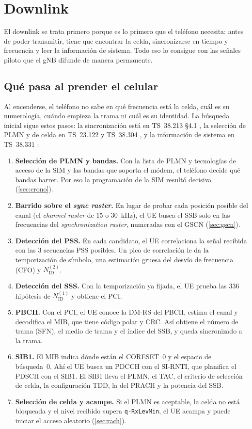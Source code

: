 \section{Downlink}\label{sec:dl}

El downlink se trata primero porque es lo primero que el teléfono necesita: antes de poder transmitir, tiene que encontrar la celda, sincronizarse en tiempo y frecuencia y leer la información de sistema. Todo eso lo consigue con las señales piloto que el gNB difunde de manera permanente.

\subsection{Qué pasa al prender el celular}\label{sec:encendido}
Al encenderse, el teléfono no sabe en qué frecuencia está la celda, cuál es su numerología, cuándo empieza la trama ni cuál es su identidad. La búsqueda inicial sigue estos pasos: la sincronización está en TS~38.213 §4.1 \cite{ts38213}, la selección de PLMN y de celda en TS~23.122 y TS~38.304 \cite{ts23122,ts38304}, y la información de sistema en TS~38.331 \cite{ts38331}:
\begin{enumerate}
  \item \textbf{Selección de PLMN y bandas.} Con la lista de PLMN y tecnologías de acceso de la SIM y las bandas que soporta el módem, el teléfono decide qué bandas barrer. Por eso la programación de la SIM resultó decisiva (\cref{sec:crono}).
  \item \textbf{Barrido sobre el \emph{sync raster}.} En lugar de probar cada posición posible del canal (el \emph{channel raster} de 15 o 30~kHz), el UE busca el SSB solo en las frecuencias del \emph{synchronization raster}, numeradas con el GSCN (\cref{sec:gscn}).
  \item \textbf{Detección del PSS.} En cada candidato, el UE correlaciona la señal recibida con las 3 secuencias PSS posibles. Un pico de correlación le da la temporización de símbolo, una estimación gruesa del desvío de frecuencia (CFO) y $N_\text{ID}^{(2)}$.
  \item \textbf{Detección del SSS.} Con la temporización ya fijada, el UE prueba las 336 hipótesis de $N_\text{ID}^{(1)}$ y obtiene el PCI.
  \item \textbf{PBCH.} Con el PCI, el UE conoce la DM-RS del PBCH, estima el canal y decodifica el MIB, que tiene código polar y CRC. Así obtiene el número de trama (SFN), el medio de trama y el índice del SSB, y queda sincronizado a la trama.
  \item \textbf{SIB1.} El MIB indica dónde están el CORESET~0 y el espacio de búsqueda~0. Ahí el UE busca un PDCCH con el SI-RNTI, que planifica el PDSCH con el SIB1. El SIB1 lleva el PLMN, el TAC, el criterio de selección de celda, la configuración TDD, la del PRACH y la potencia del SSB.
  \item \textbf{Selección de celda y acampe.} Si el PLMN es aceptable, la celda no está bloqueada y el nivel recibido supera \texttt{q-RxLevMin}, el UE acampa y puede iniciar el acceso aleatorio (\cref{sec:rach}).
\end{enumerate}
